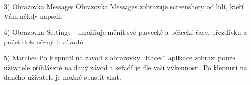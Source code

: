 \documentclass{article}
\begin{document}
\vspace{10 mm}













3) Obrazovka Messages
\vspace{10 mm}
Obrazovka Messages zobrazuje screenshoty od lidí, kteří Vám někdy napsali.
\vspace{10 mm}





















4) Obrazovka Settings - umožňuje měnit své plavecké a běžecké časy, přezdívku a počet dokončených závodů
\vspace{10 mm}




















5) Matches
Po klepnutí na závod z obrazovky “Races” aplikace zobrazí pouze uživatele přihlášené na daný závod a seřadí je dle vaší výkonnosti. Po klepnutí na daného uživatele je možné spustit chat.
\vspace{10 mm}
\end{document}
